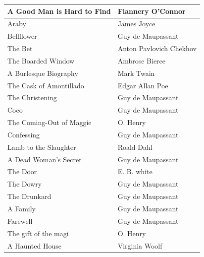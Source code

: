 \documentclass[11pt]{article}
\begin{document}
\begin{longtable}{l|l}
  A Good Man is Hard to Find                        & Flannery O'Connor          \\ \hline
  Araby                                             & James Joyce                \\ \hline
  Bellflower                                        & Guy de Maupassant          \\ \hline
  The Bet                                           & Anton Pavlovich Chekhov    \\ \hline
  The Boarded Window                                & Ambrose Bierce             \\ \hline
  A Burlesque Biography                             & Mark Twain                 \\ \hline
  The Cask of Amontillado                           & Edgar Allan Poe            \\ \hline
  The Christening                                   & Guy de Maupassant          \\ \hline
  Coco                                              & Guy de Maupassant          \\ \hline
  The Coming-Out of Maggie                          & O. Henry                   \\ \hline
  Confessing                                        & Guy de Maupassant          \\ \hline
  Lamb to the Slaughter                             & Roald Dahl                 \\ \hline
  A Dead Woman's Secret                             & Guy de Maupassant          \\ \hline
  The Door                                          & E. B. white                \\ \hline
  The Dowry                                         & Guy de Maupassant          \\ \hline
  The Drunkard                                      & Guy de Maupassant          \\ \hline
  A Family                                          & Guy de Maupassant          \\ \hline
  Farewell                                          & Guy de Maupassant          \\ \hline
  The gift of the magi                              & O. Henry                   \\ \hline
  A Haunted House                                   & Virginia Woolf             \\ \hline

\end{longtable}
\end{document}
